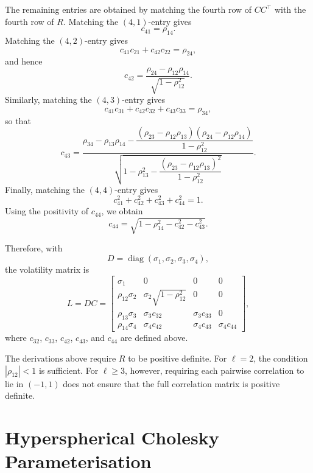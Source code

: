 The remaining entries are obtained by matching the fourth row of
\(CC^\top\) with the fourth row of \(R\). Matching the \((4,1)\)-entry gives
\[
c_{41}=\rho_{14}.
\]
Matching the \((4,2)\)-entry gives
\[
c_{41}c_{21}+c_{42}c_{22}=\rho_{24},
\]
and hence
\[
c_{42}
=
\frac{\rho_{24}-\rho_{12}\rho_{14}}
{\sqrt{1-\rho_{12}^2}}.
\]
Similarly, matching the \((4,3)\)-entry gives
\[
c_{41}c_{31}+c_{42}c_{32}+c_{43}c_{33}=\rho_{34},
\]
so that
\[
c_{43}
=
\frac{
\rho_{34}-\rho_{13}\rho_{14}
-\dfrac{
(\rho_{23}-\rho_{12}\rho_{13})
(\rho_{24}-\rho_{12}\rho_{14})
}{
1-\rho_{12}^2
}
}{
\sqrt{
1-\rho_{13}^2
-\dfrac{
(\rho_{23}-\rho_{12}\rho_{13})^2
}{
1-\rho_{12}^2
}
}
}.
\]
Finally, matching the \((4,4)\)-entry gives
\[
c_{41}^2+c_{42}^2+c_{43}^2+c_{44}^2=1.
\]
Using the positivity of \(c_{44}\), we obtain
\[
c_{44}
=
\sqrt{
1-\rho_{14}^2-c_{42}^2-c_{43}^2
}.
\]

Therefore, with
\[
D=\operatorname{diag}(\sigma_1,\sigma_2,\sigma_3,\sigma_4),
\]
the volatility matrix is
\[
L=DC
=
\begin{bmatrix}
\sigma_1 & 0 & 0 & 0 \\[0.5em]
\rho_{12}\sigma_2 &
\sigma_2\sqrt{1-\rho_{12}^2} &
0 &
0 \\[0.8em]
\rho_{13}\sigma_3 &
\sigma_3 c_{32} &
\sigma_3 c_{33} &
0 \\[0.8em]
\rho_{14}\sigma_4 &
\sigma_4 c_{42} &
\sigma_4 c_{43} &
\sigma_4 c_{44}
\end{bmatrix},
\]
where \(c_{32}\), \(c_{33}\), \(c_{42}\), \(c_{43}\), and \(c_{44}\) are
defined above.

The derivations above require \(R\) to be positive definite. For \(\ell=2\), the condition \(|\rho_{12}|<1\) is sufficient. For \(\ell\geq3\), however, requiring each pairwise correlation to lie in \((-1,1)\) does not ensure that the full correlation matrix is positive definite. 


\section{Hyperspherical Cholesky Parameterisation}
\label{app:hyperspherical_cholesky}


